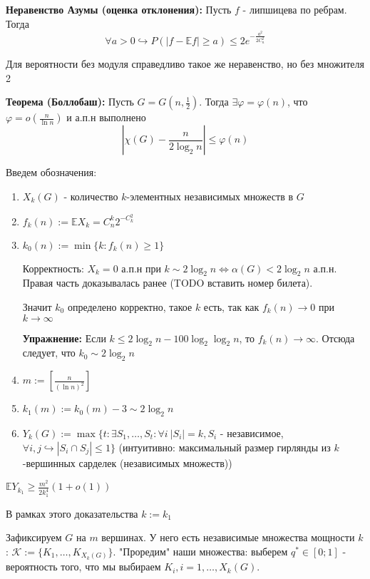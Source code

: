 \par \textbf{Неравенство Азумы (оценка отклонения):} Пусть $f$ - липшицева по ребрам. Тогда $$\forall a > 0 \hookrightarrow P(|f - \mathbb{E} f| \geq a) \leq 2e^{-\frac{a^2}{2C_n^2}}$$

\par \Note Для вероятности без модуля справедливо такое же неравенство, но без множителя 2

\par \textbf{Теорема (Боллобаш):} Пусть $G=G(n, \frac{1}{2})$. Тогда $\exists \varphi=\varphi(n)$, что $\varphi=o(\frac{n}{\ln{n}})$ и а.п.н выполнено $$|\chi(G)-\frac{n}{2\log_2 n}| \leq \varphi(n)$$

\par Введем обозначения: \begin{enumerate}
    \item $X_k(G)$ - количество $k$-элементных независимых множеств в $G$
    \item $f_k(n):=\mathbb{E}X_k=C_n^k 2^{-C_k^2}$
    \item $k_0(n):=\min \{k: f_k(n) \geq 1\}$ 
    \par Корректность: $X_k=0$ а.п.н при $k\sim 2\log_2 n \Leftrightarrow \alpha(G) < 2\log_2 n$ а.п.н. Правая часть доказывалась ранее (TODO вставить номер билета).
    \par Значит $k_0$ определено корректно, такое $k$ есть, так как $f_k(n)\rightarrow 0$ при $k\rightarrow \infty$
    \par \textbf{Упражнение:} Если $k \leq 2\log_2 n - 100 \log_2\log_2 n$, то $f_k(n)\rightarrow \infty$. Отсюда следует, что $k_0 \sim 2\log_2 n$
    \item $m:=[\frac{n}{(\ln{n})^2}]$
    \item $k_1(m):=k_0(m)-3 \sim 2\log_2 n$
    \item $Y_k(G):=\max \{t: \exists S_1, \ldots, S_t: \forall i \: |S_i|=k, S_i$ - независимое, $\forall i, j \hookrightarrow |S_i \cap S_j| \leq 1\}$ (интуитивно: максимальный размер гирлянды из $k$-вершинных сарделек (независимых множеств))
\end{enumerate}

\par \Lemma $\mathbb{E}Y_{k_1} \geq \frac{m^2}{2k_1^4}(1+o(1))$
\par \Note В рамках этого доказательства $k:=k_1$
\par \Proof Зафиксируем $G$ на $m$ вершинах. У него есть независимые множества мощности $k$: $\mathcal{K}:=\{K_1, \ldots, K_{X_k(G)}\}$. "Проредим" наши множества: выберем $q^* \in [0; 1]$ - вероятность того, что мы выбираем $K_i, i=1, \ldots, X_k(G)$.

